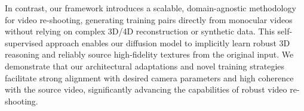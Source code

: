 In contrast, our framework introduces a scalable, domain-agnostic methodology for video re-shooting, generating training pairs directly from monocular videos without relying on complex 3D/4D reconstruction or synthetic data. This self-supervised approach enables our diffusion model to implicitly learn robust 3D reasoning and reliably source high-fidelity textures from the original input. We demonstrate that our architectural adaptations and novel training strategies facilitate strong alignment with desired camera parameters and high coherence with the source video, significantly advancing the capabilities of robust video re-shooting.